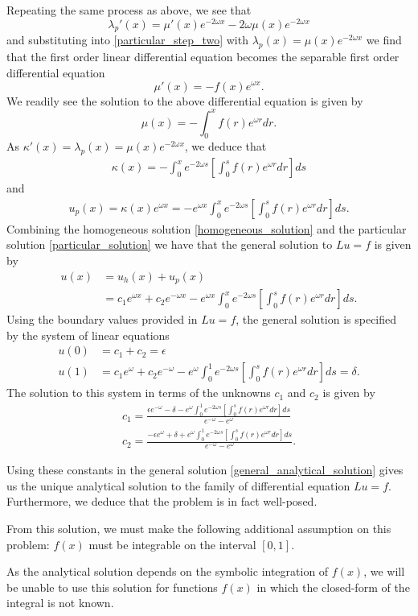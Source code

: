 Repeating the same process as above, we see that
\[
\lambda_p'(x) = \mu'(x) e^{-2 \omega x} - 2 \omega\mu(x) e^{-2 \omega x}
\]
and substituting into \eqref{particular_step_two} with $\lambda_p(x) = \mu(x) e^{-2\omega x}$
we find that the first order linear differential equation becomes the separable first order differential
equation
\[
\mu'(x) = -f(x)e^{\omega x}.
\]
We readily see the solution to the above differential equation is given by
\[
\mu(x) = - \int_{0}^x f(r) e^{\omega r} dr.
\]
As $\kappa'(x) = \lambda_p(x) = \mu(x)e^{-2\omega x}$, we deduce that
\begin{align*}
  \kappa(x) = - \int_{0}^{x} e^{-2 \omega s} \left[ \int_{0}^s f(r) e^{\omega r} dr \right] ds
\end{align*}
and
\begin{align}\label{particular_solution}
  u_p(x) = \kappa(x)e^{\omega x} = -e^{\omega x} \int_{0}^{x} e^{-2 \omega s} \left[ \int_{0}^s f(r) e^{\omega r} dr \right] ds.
\end{align}
Combining the homogeneous solution \eqref{homogeneous_solution} and the particular
solution \eqref{particular_solution} we have that the general solution to
$Lu = f$ is given by
\begin{align}\label{general_analytical_solution}
  u(x) &= u_h(x) + u_p(x) \nonumber \\
  &= c_1 e^{\omega x} + c_2 e^{-\omega x} - e^{\omega x} \int_{0}^{x} e^{-2 \omega s} \left[ \int_{0}^s f(r) e^{\omega r} dr \right] ds.
\end{align}
Using the boundary values provided in $Lu=f$, the general solution is specified
by the system of linear equations
\begin{align*}
  u(0) &= c_1 + c_2 = \epsilon \\
  u(1) &= c_1 e^{\omega} + c_2 e^{-\omega} - e^{\omega} \int_{0}^{1} e^{-2 \omega s} \left[ \int_{0}^s f(r) e^{\omega r} dr \right] ds = \delta .
\end{align*}
The solution to this system in terms of the unknowns $c_1$ and $c_2$ is given
by
\begin{align*}
  c_1 = \frac{\epsilon e^{-\omega} - \delta - e^{\omega} \int_{0}^{1} e^{-2 \omega s} \left[ \int_{0}^s f(r) e^{\omega r} dr \right] ds}{e^{-\omega} - e^{\omega}}\\
  c_2 = \frac{-\epsilon e^{\omega} + \delta + e^{\omega} \int_{0}^{1} e^{-2 \omega s} \left[ \int_{0}^s f(r) e^{\omega r} dr \right] ds}{e^{-\omega} - e^{\omega}}.
\end{align*}

Using these constants in the general solution \eqref{general_analytical_solution}
gives us the unique analytical solution to the family of differential equation $Lu = f$.
Furthermore, we deduce that the problem is in fact well-posed.

From this solution, we must make the following additional assumption on this
problem: $f(x)$ must be integrable on the interval $[0, 1]$.

As the analytical solution depends on the symbolic integration of $f(x)$, we
will be unable to use this solution for functions $f(x)$ in which the
closed-form of the integral is not known.
